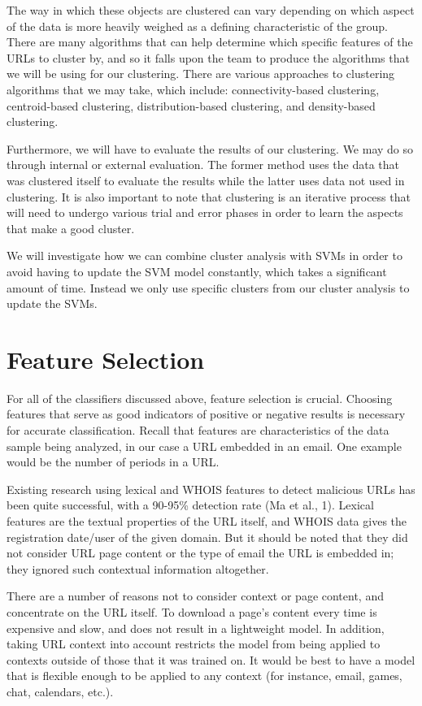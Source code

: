 \documentclass[cs,proposal]{hmcclinic}
\begin{document}
The way in which these objects are clustered can vary depending on which aspect of the data is more heavily weighed as a defining characteristic of the group. There are many algorithms that can help determine which specific features of the URLs to cluster by, and so it falls upon the team to produce the algorithms that we will be using for our clustering. There are various approaches to clustering algorithms that we may take, which include: connectivity-based clustering, centroid-based clustering, distribution-based clustering, and density-based clustering. 

Furthermore, we will have to evaluate the results of our clustering. We may do so through internal or external evaluation. The former method uses the data that was clustered itself to evaluate the results while the latter uses data not used in clustering. It is also important to note that clustering is an iterative process that will need to undergo various trial and error phases in order to learn the aspects that make a good cluster.

We will investigate how we can combine cluster analysis with SVMs in order to avoid having to update the SVM model constantly, which takes a significant amount of time. Instead we only use specific clusters from our cluster analysis to update the SVMs.


\section{Feature Selection} \label{feature-selection}

For all of the classifiers discussed above, feature selection is crucial. Choosing features that serve as good indicators of positive or negative results is necessary for accurate classification. Recall that features are characteristics of the data sample being analyzed, in our case a URL embedded in an email. One example would be the number of periods in a URL.

Existing research using lexical and WHOIS features to detect malicious URLs has been quite successful, with a 90-95\% detection rate (Ma et al., 1). Lexical features are the textual properties of the URL itself, and WHOIS data gives the registration date/user of the given domain. But it should be noted that they did not consider URL page content or the type of email the URL is embedded in; they ignored such contextual information altogether.

There are a number of reasons not to consider context or page content, and concentrate on the URL itself. To download a page's content every time is expensive and slow, and does not result in a lightweight model. In addition, taking URL context into account restricts the model from being applied to contexts outside of those that it was trained on. It would be best to have a model that is flexible enough to be applied to any context (for instance, email, games, chat, calendars, etc.). 
\end{document}
